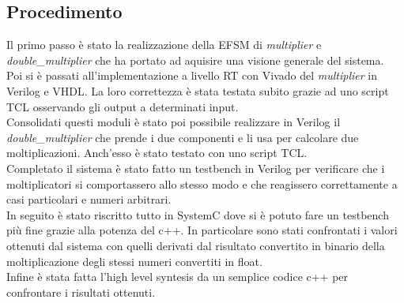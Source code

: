 \documentclass[]{IEEEtran}
\begin{document}
\subsection{Procedimento}
Il primo passo è stato la realizzazione della EFSM di \textit{multiplier} e \textit{double\_multiplier} che ha portato ad aquisire una visione generale del sistema.
\\Poi si è passati all'implementazione a livello RT con Vivado\cite{Vivado} del \textit{multiplier} in Verilog e VHDL. La loro correttezza è stata testata subito grazie ad uno script TCL osservando gli output a determinati input.
\\Consolidati questi moduli è stato poi possibile realizzare in Verilog il \textit{double\_multiplier} che prende i due componenti e li usa per calcolare due moltiplicazioni. Anch'esso è stato testato con uno script TCL.
\\Completato il sistema è stato fatto un testbench in Verilog per verificare che i moltiplicatori si comportassero allo stesso modo e che reagissero correttamente a casi particolari e numeri arbitrari.
\\In seguito è stato riscritto tutto in SystemC dove si è potuto fare un testbench più fine grazie alla potenza del c++. In particolare sono stati confrontati i valori ottenuti dal sistema con quelli derivati dal risultato convertito in binario della moltiplicazione degli stessi numeri convertiti in float.
\\Infine è stata fatta l'high level syntesis da un semplice codice c++ per confrontare i risultati ottenuti.
\end{document}
